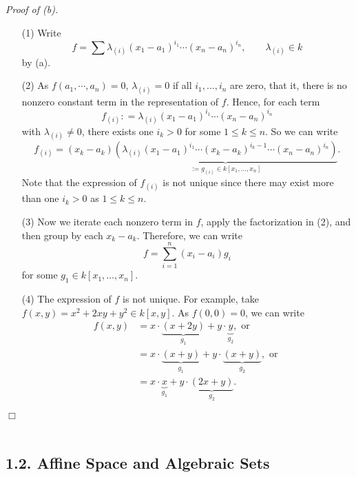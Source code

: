 \documentclass{article}
\begin{document}
\emph{Proof of (b).}
\begin{enumerate}
\item[(1)]
  Write
  \[
    f = \sum \lambda_{(i)} (x_1-a_1)^{i_1} \cdots (x_n-a_n)^{i_n},
    \qquad
    \lambda_{(i)} \in k
  \]
  by (a).

\item[(2)]
  As $f(a_1, \cdots, a_n) = 0$,
  $\lambda_{(i)} = 0$ if all $i_1, \ldots, i_n$ are zero, that it,
  there is no nonzero constant term in the representation of $f$.
  Hence, for each term
  \[
    f_{(i)} : = \lambda_{(i)} (x_1-a_1)^{i_1} \cdots (x_n-a_n)^{i_n}
  \]
  with $\lambda_{(i)} \neq 0$,
  there exists one $i_k > 0$ for some $1 \leq k \leq n$.
  So we can write
  \[
    f_{(i)}
    =
    (x_k-a_k)
      \underbrace{
        (\lambda_{(i)} (x_1-a_1)^{i_1} \cdots (x_k-a_k)^{i_k-1} \cdots (x_n-a_n)^{i_n})}_{
          := g_{(i)} \in k[x_1,\ldots,x_n]}.
  \]
  Note that the expression of $f_{(i)}$ is not unique since
  there may exist more than one $i_k > 0$ as $1 \leq k \leq n$.

\item[(3)]
  Now we iterate each nonzero term in $f$, apply the factorization in (2),
  and then group by each $x_k-a_k$.
  Therefore, we can write
  \[
    f = \sum_{i=1}^{n}(x_i-a_i)g_i
  \]
  for some $g_1 \in k[x_1, \ldots, x_n]$.

\item[(4)]
  The expression of $f$ is not unique.
  For example, take $f(x,y) = x^2 + 2xy + y^2 \in k[x,y]$.
  As $f(0,0) = 0$, we can write
  \begin{align*}
    f(x,y)
    &= x \cdot \underbrace{(x+2y)}_{g_1} + y \cdot \underbrace{y}_{g_2}, \text{ or } \\
    &= x \cdot \underbrace{(x+y)}_{g_1} + y \cdot \underbrace{(x+y)}_{g_2}, \text{ or } \\
    &= x \cdot \underbrace{x}_{g_1} + y \cdot \underbrace{(2x+y)}_{g_2}.
  \end{align*}
\end{enumerate}
$\Box$ \\\\






\subsection*{1.2. Affine Space and Algebraic Sets \\}
\end{document}

